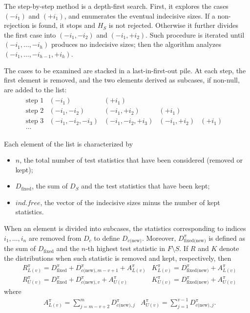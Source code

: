 \documentclass[11pt,a4paper,openright,twoside]{article}
\begin{document}
The step-by-step method is a depth-first search. First, it explores the cases $(-i_1)$ and $(+i_1)$, and enumerates the eventual indecisive sizes. If a non-rejection is found, it stops and $H_S$ is not rejected. Otherwise it further divides the first case into $(-i_1,-i_2)$ and $(-i_1,+i_2)$. Such procedure is iterated until $(-i_1,\ldots,-i_h)$ produces no indecisive sizes; then the algorithm analyzes $(-i_1,\ldots,-i_{h-1},+i_h)$.

The cases to be examined are stacked in a last-in-first-out pile. At each step, the first element is removed, and the two elements derived as subcases, if non-null, are added to the list:
\begin{align*}
\begin{matrix}
\text{step 1} & (-i_1) & (+i_1) &  &  & \\
\text{step 2} & (-i_1,-i_2) & (-i_1,+i_2) & (+i_1) &  \\
\text{step 3}  &(-i_1,-i_2,-i_3) & (-i_1,-i_2,+i_3) & (-i_1,+i_2) & (+i_1) \\
\ldots &  &  &  &  
\end{matrix}
\end{align*}

Each element of the list is characterized by
\begin{itemize}
\item $n$, the total number of test statistics that have been considered (removed or kept);
\item $D_{\text{fixed}}$, the sum of $D_S$ and the test statistics that have been kept;
\item $ind.free$, the vector of the indecisive sizes minus the number of kept statistics.
\end{itemize}

When an element is divided into subcases, the statistics corresponding to indices $i_1,\ldots,i_{n}$ are removed from $D_c$ to define $D_{c\text{(new)}}$. Moreover, $D_{\text{fixed(new)}}^{\pi}$ is defined as the sum of $D_{\text{fixed}}$ and the $n$-th highest test statistic in $F\setminus S$. If $R$ and $K$ denote the distributions when such statistic is removed and kept, respectively, then
\begin{align*}
&R_{L(v)}^{\pi}=D_{\text{fixed}}^{\pi}+D_{c\text{(new)},m-v+1}^{\pi} + A_{L(v)}^{\pi} & K_{L(v)}^{\pi}=D_{\text{fixed(new)}}^{\pi}+A_{L(v)}^{\pi}\\
&R_{U(v)}^{\pi}=D_{\text{fixed}}^{\pi}+D_{c\text{(new)},v}^{\pi}+A_{U(v)}^{\pi} & K_{U(v)}^{\pi}=D_{\text{fixed(new)}}^{\pi}+A_{U(v)}^{\pi}
\end{align*}
where
\begin{align*}
& A_{L(v)}^{\pi}=\sum_{j=m-v+2}^{m} D_{c\text{(new)},j}^{\pi} & A_{U(v)}^{\pi}=\sum_{j=1}^{v-1}  D_{c\text{(new)},j}^{\pi}.
\end{align*}
\end{document}
